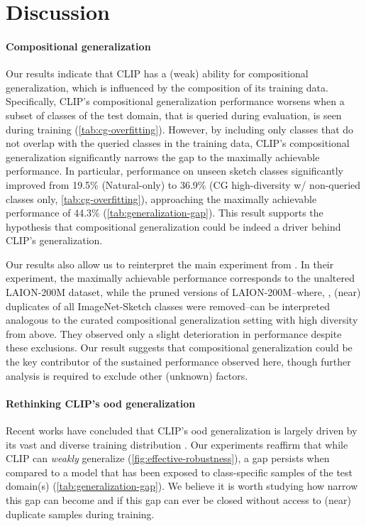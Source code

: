 \section{Discussion}
\paragraph{Compositional generalization}
Our results indicate that CLIP has a (weak) ability for compositional generalization, which is influenced by the composition of its training data. Specifically, CLIP's compositional generalization performance worsens when a subset of classes of the test domain, that is queried during evaluation, is seen during training (\cref{tab:cg-overfitting}).
However, by including only classes that do not overlap with the queried classes in the training data, CLIP's compositional generalization significantly narrows the gap to the maximally achievable performance.
In particular, performance on unseen sketch classes significantly improved from 19.5\% (Natural-only) to 36.9\% (CG high-diversity w/ non-queried classes only, \cref{tab:cg-overfitting}), approaching the maximally achievable performance of 44.3\% (\cref{tab:generalization-gap}). This result supports the hypothesis that compositional generalization could be indeed a driver behind CLIP's generalization.

Our results also allow us to reinterpret the main experiment from \citet[Table 1]{mayilvahanan2024does}. In their experiment, the maximally achievable performance corresponds to the unaltered LAION-200M dataset, while the pruned versions of LAION-200M--where, \eg, (near) duplicates of all ImageNet-Sketch classes were removed--can be interpreted analogous to the curated compositional generalization setting with high diversity from above. They observed only a slight deterioration in performance despite these exclusions. Our result suggests that compositional generalization could be the key contributor of the sustained performance observed here, though further analysis is required to exclude other (unknown) factors.

\paragraph{Rethinking CLIP's \acrshort{ood} generalization}
Recent works have concluded that CLIP's \acrshort{ood} generalization is largely driven by its vast and diverse training distribution \citep{fang2022data,mayilvahanan2024search}. Our experiments reaffirm that while CLIP can \emph{weakly} generalize (\cref{fig:effective-robustness}), a gap persists when compared to a model that has been exposed to class-specific samples of the test domain(s) (\cref{tab:generalization-gap}). We believe it is worth studying how narrow this gap can become and if this gap can ever be closed without access to (near) duplicate samples during training.

